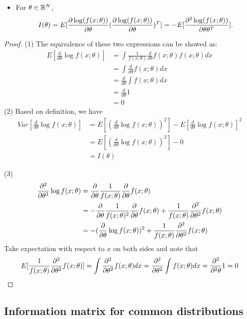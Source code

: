 \begin{refsection}
\begin{theorem}
\begin{itemize}
		\item For $\theta \in \mathbb{R}^N$, 
		$$I(\theta) = E[\frac{\partial \log(f(x;\theta))}{\partial \theta}(\frac{\partial \log(f(x;\theta))}{\partial \theta})^T] = -E[\frac{\partial^2 \log(f(x;\theta))}{\partial \theta\theta^T}].$$   
	\end{itemize}	
\end{theorem}
\begin{proof}
	(1)	
	The equivalence of these two expressions can be showed as:
	\begin{align*}
	E[\frac{d}{d\theta} \log f(x;\theta)] &= \int \frac{1}{f(x;\theta)} \frac{d}{d\theta} f(x;\theta) f(x;\theta) dx \\
	&= \int  \frac{d}{d\theta} f(x;\theta)  dx \\
	&= \frac{d}{d\theta} \int f(x;\theta)  dx \\
	& = \frac{d}{d\theta} 1 \\
	&= 0
	\end{align*}
	(2) Based on definition, we have
	\begin{align*}
	Var[\frac{d}{d\theta}\log f(x;\theta)] &= E[(\frac{d}{d\theta}\log f(x;\theta))^2] - E[\frac{d}{d\theta}\log f(x;\theta)]^2 \\
	&= E[(\frac{d}{d\theta}\log f(x;\theta))^2] - 0 \\
	&= I(\theta)
	\end{align*}
	
(3)
\begin{align*}
\frac{\partial^2}{\partial \theta^2} \log f(x;\theta) &= \frac{\partial}{\partial \theta}\frac{1}{f(x;\theta)}\frac{\partial}{\partial \theta} f(x;\theta) \\
&= -\frac{\partial}{\partial \theta}\frac{1}{f(x;\theta)^2}\frac{\partial}{\partial \theta} f(x;\theta) + \frac{1}{f(x;\theta)}\frac{\partial^2}{\partial \theta^2} f(x;\theta)  \\
&= -(\frac{\partial}{\partial \theta} \log f(x;\theta))^2 + \frac{1}{f(x;\theta)}\frac{\partial^2}{\partial \theta^2} f(x;\theta)  
\end{align*}	
Take expectation with respect to $x$ on both sides and note that
$$E[\frac{1}{f(x;\theta)}\frac{\partial^2}{\partial \theta^2} f(x;\theta)]=\int \frac{\partial^2}{\partial \theta^2} f(x;\theta) dx = \frac{\partial^2}{\partial \theta^2} \int  f(x;\theta) dx =   \frac{\partial^2}{\partial^2 \theta} 1 = 0
$$
	

	
	
	
	
\end{proof}



\subsection{Information matrix for common distributions}


\end{refsection}

